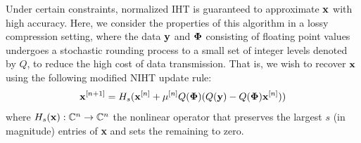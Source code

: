 \documentclass{article}
\begin{document}

Under certain constraints, normalized IHT is guaranteed to approximate ${\bf x}$ with high accuracy. Here, we consider the properties of this algorithm in a lossy compression setting, where the data ${\bf y}$ and ${\bf \Phi}$ consisting of floating point values undergoes a stochastic rounding process to a small set of integer levels denoted by $Q$, to reduce the high cost of data transmission. That is, we wish to recover ${\bf x}$ using the following modified NIHT update rule:
 \begin{equation}
     {\bf x}^{[n+1]} = H_s({\bf x}^{[n]} + \mu^{[n]}Q({\bf \Phi})(Q({\bf y}) - Q({\bf \Phi}){\bf x}^{[n]}))
 \end{equation}
where $H_s({\bf x}): \mathbb{C}^n \rightarrow \mathbb{C}^n$ the nonlinear operator that preserves the largest $s$ (in magnitude) entries of {\bf x} and sets the remaining to zero. 
 
     
\end{document}
